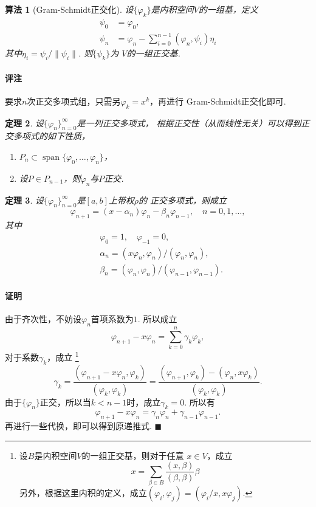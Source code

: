 \documentclass[12pt, a4paper]{article}
\theoremstyle{margin}
\newtheorem{thm}{定理}
\newtheorem{alg}[thm]{算法}
\DeclareMathOperator{\spn}{span}
\newcommand{\remark}{\paragraph{评注}}
\newcommand{\proof}{\paragraph{证明}}
\begin{document}
  \begin{alg}[Gram-Schmidt正交化]
    设$\{\varphi_k\}$是内积空间$V$的一组基，定义
    \[\begin{split}
      \psi_0 &= \varphi_0, \\
      \psi_{n} &= \varphi_n - \sum_{i=0}^{n-1}(\varphi_n, \psi_i)\eta_i
    \end{split}\]
    其中$\eta_i = \psi_i / \|\psi_i\|$. 则$\{\psi_k\}$为
    $V$的一组正交基.
  \end{alg}
  \remark
    要求$n$次正交多项式组，只需另$\varphi_k = x^k$，再进行
    Gram-Schmidt正交化即可.

  \begin{thm}
    设$\{\varphi_n\}_{n=0}^\infty$是一列正交多项式，
    根据正交性（从而线性无关）可以得到正交多项式的如下性质，
    \begin{enumerate}
      \item $P_n \subset \spn\{\varphi_0, \dots,\varphi_n\}$，
      \item 设$P\in P_{n-1}$，则$\varphi_n$与$P$正交.
    \end{enumerate}
  \end{thm}

  \begin{thm}
    设$\{\varphi_n\}_{n=0}^\infty$是$[a,b]$上带权$\rho$的
    正交多项式，则成立
    \[
      \varphi_{n+1} = (x-\alpha_n)\varphi_n - \beta_n\varphi_{n-1},
      \quad n = 0, 1,\dots,
    \]
    其中
    \[\begin{split}
      &\varphi_0 = 1,\quad \varphi_{-1} = 0,\\
      &\alpha_n = (x\varphi_n, \varphi_n) / (\varphi_n, \varphi_n),\\
      &\beta_n = (\varphi_n, \varphi_n) / (\varphi_{n-1}, \varphi_{n-1}).
    \end{split}\]
  \end{thm}
  \proof
    由于齐次性，不妨设$\varphi_n$首项系数为$1$. 所以成立
    \[
      \varphi_{n+1}-x\varphi_n = \sum_{k=0}^n\gamma_k\varphi_k,
    \]
    对于系数$\gamma_k$，成立
    \footnote{
      设$B$是内积空间$V$的一组正交基，则对于任意
      $x\in V$，成立
      \[
        x = \sum_{\beta\in B}\frac{(x,\beta)}{(\beta,\beta)}\beta
      \]
      另外，根据这里内积的定义，成立$(\varphi_i,\varphi_j)
      =(\varphi_i/x, x\varphi_j)$.
    }
    \[
      \gamma_k = \frac{(\varphi_{n+1}-x\varphi_n,\varphi_k)}
      {(\varphi_k, \varphi_k)}
      = \frac{(\varphi_{n+1},\varphi_k) - (\varphi_n, x\varphi_k)}{(\varphi_k,\varphi_k)}.
    \]
    由于$\{\varphi_n\}$正交，所以当$k<n-1$时，成立$\gamma_k=0$.
    所以有
    \[
      \varphi_{n+1} - x\varphi_n = \gamma_n\varphi_n + \gamma_{n-1}\varphi_{n-1}.
    \]
    再进行一些代换，即可以得到原递推式. $\blacksquare$
\end{document}
